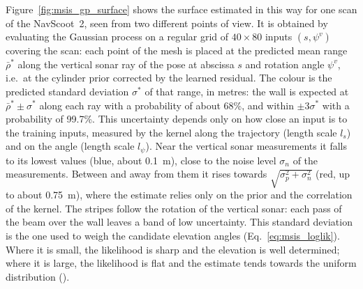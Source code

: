 Figure~\ref{fig:msis_gp_surface} shows the surface estimated in this way for one scan of the
NavScoot~2, seen from two different points of view. It is obtained by evaluating the Gaussian process
on a regular grid of $40 \times 80$ inputs $(s, \psi^v)$ covering the scan: each point of the mesh is
placed at the predicted mean range $\bar{\rho}^{*}$ along the vertical sonar ray of the pose at
abscissa $s$ and rotation angle $\psi^v$, i.e.\ at the cylinder prior corrected by the learned
residual. The colour is the predicted standard deviation $\sigma^{*}$ of that range, in metres: the
wall is expected at $\bar{\rho}^{*} \pm \sigma^{*}$ along each ray with a probability of about 68\%,
and within $\pm 3\sigma^{*}$ with a probability of 99.7\%. This uncertainty depends only on how close
an input is to the training inputs, measured by the kernel along the trajectory (length scale $l_s$)
and on the angle (length scale $l_\psi$). Near the vertical sonar measurements it falls to its lowest
values (blue, about 0.1~m), close to the noise level $\sigma_n$ of the measurements. Between and away
from them it rises towards $\sqrt{\sigma_p^2 + \sigma_n^2}$ (red, up to about 0.75~m), where the
estimate relies only on the prior and the correlation of the kernel. The stripes follow the rotation
of the vertical sonar: each pass of the beam over the wall leaves a band of low uncertainty. This
standard deviation is the one used to weigh the candidate elevation angles
(Eq.~\eqref{eq:msis_loglik}). Where it is small, the likelihood is sharp and the elevation is well
determined; where it is large, the likelihood is flat and the estimate tends towards the uniform
distribution ().

